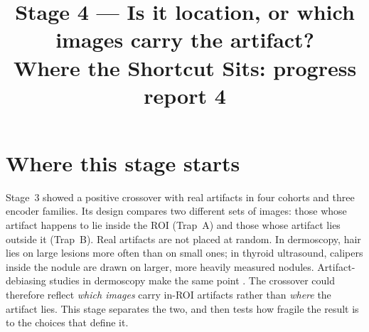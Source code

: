 

\newcommand{\notY}{1 = melanoma, malignant nodule, tumour with a solid component, erosion}
\newcommand{\notA}{a real artifact: hair, sonographer caliper, capsule debris --- in its natural position (real traps) or pasted (transplant)}
\newcommand{\notROI}{lesion, nodule, tumour, union of expert lesion boxes}
\newcommand{\notCross}{real traps: $[\text{mask}-\text{ERM}]_{\text{Trap B}}-[\text{mask}-\text{ERM}]_{\text{Trap A}}$; transplant: location interaction $[\text{mask}-\text{ERM}]_{\text{pasted outside}}-[\text{mask}-\text{ERM}]_{\text{pasted inside}}$ on the same images (reversed-test AUROC).}
\newcommand{\notCI}{95\% crossed seed$\times$image bootstrap interval (Stage~1); every interval in this report uses it.}
\newcommand{\notExtra}{SMD & standardised mean difference of a covariate between two groups of images ($|$SMD$|>0.1$: imbalanced). \\}
\title{\textbf{Stage 4 --- Is it location, or which images carry the artifact?}\\[3pt]\large Where the Shortcut Sits: progress report 4}
\author{}
\date{}

\maketitle
{}


\tableofcontents
\clearpage

\section{Where this stage starts}
Stage~3 showed a positive crossover with real artifacts in four cohorts and three encoder families. Its design compares
two different sets of images: those whose artifact happens to lie inside the ROI (Trap~A) and those whose artifact lies
outside it (Trap~B). Real artifacts are not placed at random. In dermoscopy, hair lies on large lesions more often than on
small ones; in thyroid ultrasound, calipers inside the nodule are drawn on larger, more heavily measured nodules.
Artifact-debiasing studies in dermoscopy make the same point \citep{bissoto2020debiasing,nauta2022uncovering}. The
crossover could therefore reflect \emph{which images} carry in-ROI artifacts rather than \emph{where} the artifact lies.
This stage separates the two, and then tests how fragile the result is to the choices that define it.

